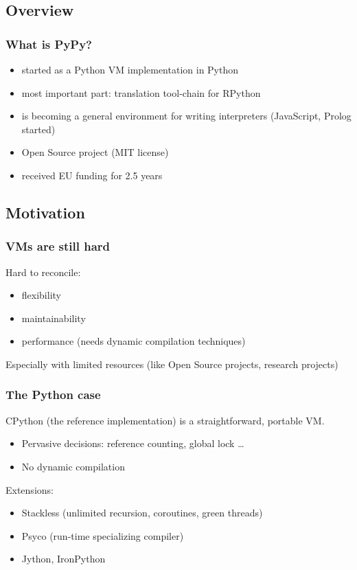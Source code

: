 \documentclass[utf8]{beamer}
\begin{document}
\subsection{Overview}
\begin{frame}
  \frametitle{What is PyPy?}
  \begin{itemize}
  \item
    started as a Python VM implementation in Python
  \item
    most important part: translation tool-chain for RPython
  \item
    is becoming a general environment for writing interpreters (JavaScript, Prolog started)
  \item
    Open Source project (MIT license)
  \item
    received EU funding for 2.5 years
  \end{itemize}

\end{frame}

\subsection{Motivation}
\begin{frame}
  \frametitle{VMs are still hard}
  Hard to reconcile:

  \begin{itemize}
  \item
    flexibility
  \item
    maintainability
  \item
    performance (needs dynamic compilation techniques)
  \end{itemize}
  Especially with limited resources (like Open Source projects, research projects)
\end{frame}


\begin{frame}
  \frametitle{The Python case}
  CPython (the reference implementation) is a straightforward, portable VM.

  \begin{itemize}
  \item
    Pervasive decisions: reference counting, global lock \dots
  \item
    No dynamic compilation
  \end{itemize}
  \pause
  \begin{block}{
    Extensions:}
    \begin{itemize}
    \item
      \alert{Stackless} (unlimited recursion, coroutines, green threads)
    \item
      \alert{Psyco} (run-time specializing compiler)
    \item
      \alert{Jython}, \alert{IronPython}
    \end{itemize}
  \end{block}
\end{frame}
\end{document}
